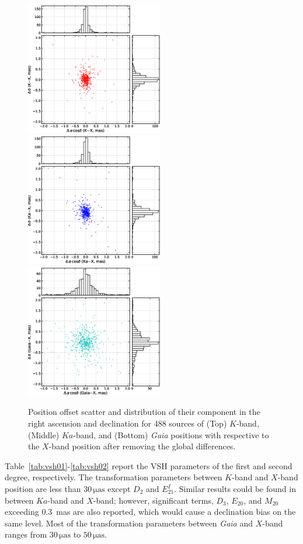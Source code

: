 \documentclass{aa}
\begin{document}
    \begin{figure}[hbtp]
        \centering
        \includegraphics[width=60mm]{figs/k-sx-scatter}
        \includegraphics[width=60mm]{figs/xka-sx-scatter}
        \includegraphics[width=60mm]{figs/gaia-sx-scatter}
        \caption[]{\label{fig:pos-offset-scatter}
            Position offset scatter and distribution of their component in the right ascension and declination for 488 sources of  (Top) $K$-band, (Middle) $Ka$-band, and (Bottom) \textit{Gaia} positions with respective to the $X$-band position after removing the global differences.
        }
    \end{figure}

   Table~\ref{tab:vsh01}-\ref{tab:vsh02} report the VSH parameters of the first and second degree, respectively.
   The transformation parameters between $K$-band and $X$-band position are less than $30\,\mathrm{\mu as}$ except $D_2$ and $E_{21}^I$.
   Similar results could be found in between $Ka$-band and $X$-band; however, significant terms, $D_3$, $E_{20}$, and $M_{20}$ exceeding 0.3~mas are also reported, which would cause a declination bias on the same level.
   Most of the transformation parameters between \textit{Gaia} and $X$-band ranges from $30\,\mathrm{\mu as}$ to $50\,\mathrm{\mu as}$.
\end{document}
